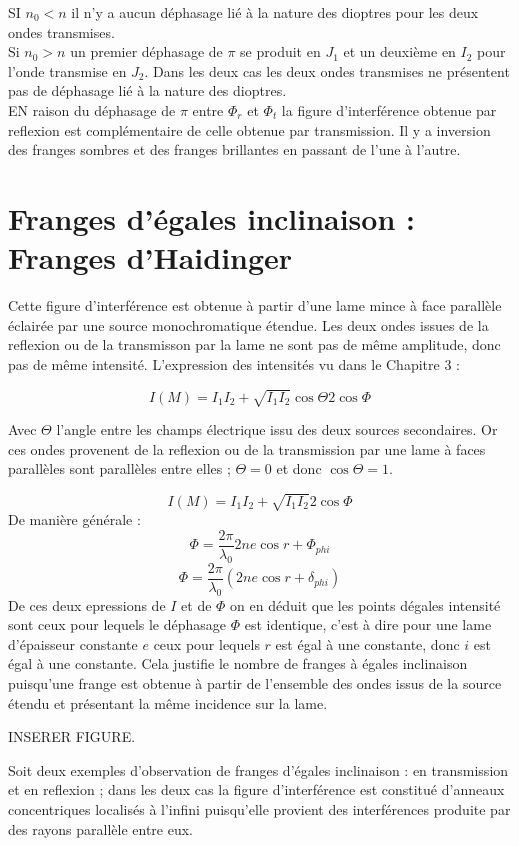 \documentclass[a4paper,12pt]{article}
\theoremstyle{StyleTheo_will}
\theoremstyle{remark}
\begin{document}
SI $n_0<n$ il n'y a aucun déphasage lié à la nature des dioptres pour les deux ondes transmises.\\ Si $n_0>n$ un premier déphasage de $\pi$ se produit en $J_1$ et un deuxième en $I_2$ pour l'onde transmise en $J_2$. Dans les deux cas les deux ondes transmises ne présentent pas de déphasage lié à la nature des dioptres. \\ EN raison du déphasage de $\pi$ entre $\varPhi_r$ et $\varPhi_t$ la figure d'interférence obtenue par reflexion est complémentaire de celle obtenue par transmission. Il y a inversion des franges sombres et des franges brillantes en passant de l'une à l'autre.
\section{Franges d'égales inclinaison : Franges d'Haidinger}

Cette figure d'interférence est obtenue à partir d'une lame mince à face parallèle éclairée par une source monochromatique étendue. Les deux ondes issues de la reflexion ou de la transmisson par la lame ne sont pas de même amplitude, donc pas de même intensité. L'expression des intensités vu dans le Chapitre 3 : 

\[I(M) = I_1 I_2 + \sqrt{I_1I_2}\cos \varTheta 2 \cos \varPhi\]

Avec $\varTheta$ l'angle entre les champs électrique issu des deux sources secondaires. Or ces ondes provenent de la reflexion ou de la transmission par une lame à faces parallèles sont parallèles entre elles ; $\varTheta = 0$ et donc $\cos \varTheta = 1$.

\[I(M) = I_1 I_2 + \sqrt{I_1I_2} 2 \cos \varPhi\]
De manière générale :
\[\varPhi = \frac{2\pi}{\lambda_0}2ne \cos r + \varPhi_{phi}\]
\[\varPhi = \frac{2\pi}{\lambda_0}(2ne \cos r + \delta_{phi})\]
De ces deux epressions de $I$ et de $\varPhi$ on en déduit que les points dégales intensité sont ceux pour lequels le déphasage $\varPhi$ est identique, c'est à dire pour une lame d'épaisseur constante $e$ ceux pour lequels $r$ est égal à une constante, donc $i$ est égal à une constante. Cela justifie le nombre de franges à égales inclinaison puisqu'une frange est obtenue à partir de l'ensemble des ondes issus de la source étendu et présentant la même incidence sur la lame.


INSERER FIGURE.

Soit deux exemples d'observation de franges d'égales inclinaison : en transmission et en reflexion ; dans les deux cas la figure d'interférence est constitué d'anneaux concentriques localisés à l'infini puisqu'elle provient des interférences produite par des rayons parallèle entre eux.
\end{document}

